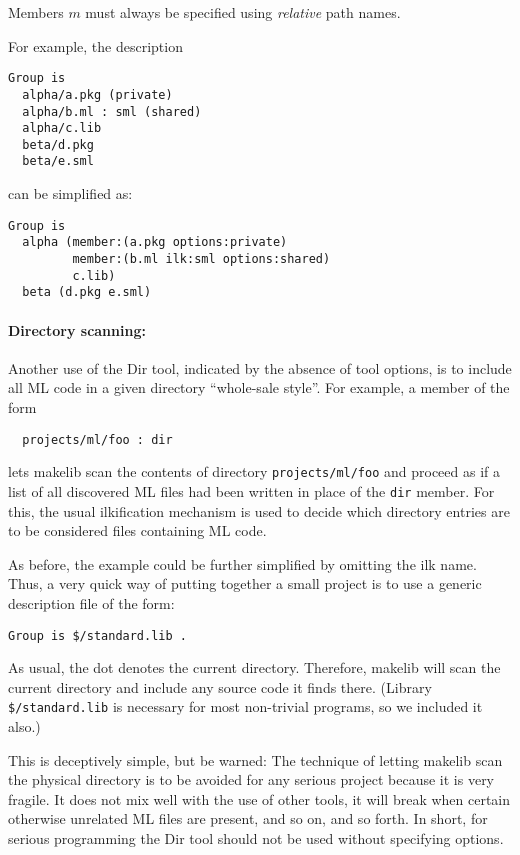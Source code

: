 Members $m$ must always be specified using {\em relative} path names.

For example, the description

\begin{verbatim}
Group is
  alpha/a.pkg (private)
  alpha/b.ml : sml (shared)
  alpha/c.lib
  beta/d.pkg
  beta/e.sml
\end{verbatim}

can be simplified as:

\begin{verbatim}
Group is
  alpha (member:(a.pkg options:private)
         member:(b.ml ilk:sml options:shared)
         c.lib)
  beta (d.pkg e.sml)
\end{verbatim}

\paragraph{Directory scanning:}
Another use of the Dir tool, indicated by the absence of tool options,
is to include all ML code in a given directory ``whole-sale style''.
For example, a member of the form

\begin{verbatim}
  projects/ml/foo : dir
\end{verbatim}

lets makelib scan the contents of directory {\tt projects/ml/foo} and
proceed as if a list of all discovered ML files had been written
in place of the {\tt dir} member.  For this, the usual ilkification
mechanism is used to decide which directory entries are to be
considered files containing ML code.

As before, the example could be further simplified by omitting the
ilk name.  Thus, a very quick way of putting together a small
project is to use a generic description file of the form:

\begin{verbatim}
Group is $/standard.lib .
\end{verbatim}

As usual, the dot denotes the current directory.  Therefore, makelib will
scan the current directory and include any source code it finds there.
(Library {\tt \$/standard.lib} is necessary for most non-trivial programs,
so we included it also.)

This is deceptively simple, but be warned: The technique of letting makelib
scan the physical directory is to be avoided for any serious project
because it is very fragile.  It does not mix well with the use of
other tools, it will break when certain otherwise unrelated ML files
are present, and so on, and so forth. In short, for serious
programming the Dir tool should not be used without specifying
options.
